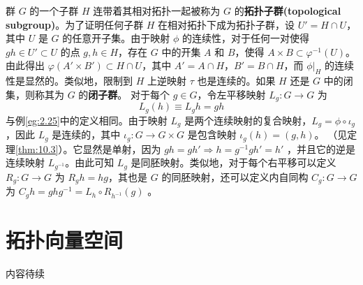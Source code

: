 	群 $G$ 的一个子群 $H$ 连带着其相对拓扑一起被称为 $G$ 的\textbf{拓扑子群(topological subgroup)}。为了证明任何子群 $H$ 在相对拓扑下成为拓扑子群，设 $U'=H\cap U$，其中 $U$ 是 $G$ 的任意开子集。由于映射 $\phi $ 的连续性，对于任何一对使得 $gh\in U'\subset U$ 的点 $g,h\in H$，存在 $G$ 中的开集 $A$ 和 $B$，使得 $A\times B\subset \varphi ^{-1} (U)$。由此得出 $\varphi (A'\times B')\subset H\cap U$，其中 $A'=A\cap H$，$B'=B\cap H$，而 $ \phi |_{H}$ 的连续性是显然的。类似地，限制到 $H$ 上逆映射 $\tau $ 也是连续的。如果 $H$ 还是 $G$ 中的闭集，则称其为 $G$ 的\textbf{闭子群}。
	对于每个 $g\in G$，令左平移映射 $L_{g} :G\rightarrow G$ 为
\begin{equation*}
L_{g} (h)\equiv L_{g} h=gh
\end{equation*}
与例\ref{eg:2.25}中的定义相同。由于映射 $L_{g}$ 是两个连续映射的复合映射，$L_{g} =\phi \circ \iota _{g}$，因此 $L_{g}$ 是连续的，其中 $\iota _{g} :G\rightarrow G\times G$ 是包含映射 $\iota _{g} (h)=(g,h)$。
（见定理\ref{thm:10.3}）。它显然是单射，因为 $gh=gh'\Longrightarrow h=g^{-1} gh'=h'$ ，并且它的逆是连续映射 $L_{g^{-1}}$。由此可知 $L_{g}$ 是同胚映射。类似地，对于每个右平移可以定义 $R_{g} :G\rightarrow G$ 为 $R_{g} h=hg$，其也是 $G$ 的同胚映射，还可以定义内自同构 $C_{g} :G\rightarrow G$ 为 $C_{g} h=ghg^{-1} =L_{h} \circ R_{h^{-1}}( g)$ 。
\section{拓扑向量空间}
内容待续
